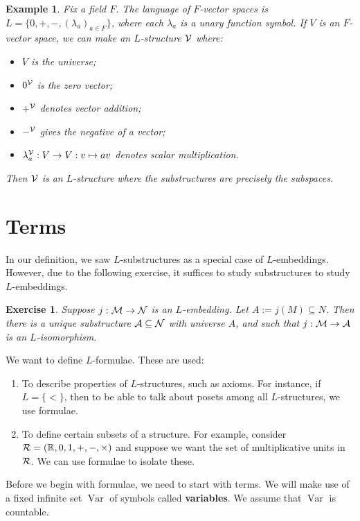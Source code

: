\documentclass[10pt]{article}
\newcommand{\R}{\mathbb{R}}
\DeclareMathOperator{\Var}{Var}
\theoremstyle{newstyle}
\newtheorem{exercise}[thm]{Exercise}
\newtheorem{exmp}[thm]{Example}
\begin{document}
\begin{exmp}
Fix a field $F$. The language of $F$-vector spaces is $L = \{0, +, -, (\lambda_a)_{a\in F}\}$, 
where each $\lambda_a$ is a unary function symbol. If $V$ is an $F$-vector space, we can make 
an $L$-structure ${\cal V}$ where:
\begin{itemize}
    \item $V$ is the universe;
    \item $0^{\cal V}$ is the zero vector;
    \item $+^{\cal V}$ denotes vector addition;
    \item $-^{\cal V}$ gives the negative of a vector;
    \item $\lambda_a^{\cal V} : V \to V : v \mapsto av$ denotes scalar multiplication.
\end{itemize}
Then ${\cal V}$ is an $L$-structure where the substructures are precisely the subspaces.
\end{exmp}

 
\newpage\section{Terms}

In our definition, we saw $L$-substructures as a special case of $L$-embeddings. 
However, due to the following exercise, it suffices to study substructures to study $L$-embeddings.

\begin{exercise}
Suppose $j : {\cal M \to N}$ is an $L$-embedding. Let $A := j(M) \subseteq N$. Then 
there is a unique substructure ${\cal A \subseteq N}$ with universe $A$, and such that 
$j : {\cal M \to A}$ is an $L$-isomorphism.
\end{exercise}

We want to define $L$-formulae. These are used:
\begin{enumerate}[(1)]
    \item To describe properties of $L$-structures, such as axioms. For instance, if 
    $L = \{<\}$, then to be able to talk about posets among all $L$-structures, we use formulae.
    \item To define certain subsets of a structure. For example, consider 
    ${\cal R} = (\R, 0, 1, +, -, \times)$ and suppose we want the set of multiplicative units in 
    ${\cal R}$. We can use formulae to isolate these.
\end{enumerate}
Before we begin with formulae, we need to start with terms. We will make use of a fixed infinite 
set $\Var$ of symbols called {\bf variables}. We assume that $\Var$ is countable.
\end{document}
